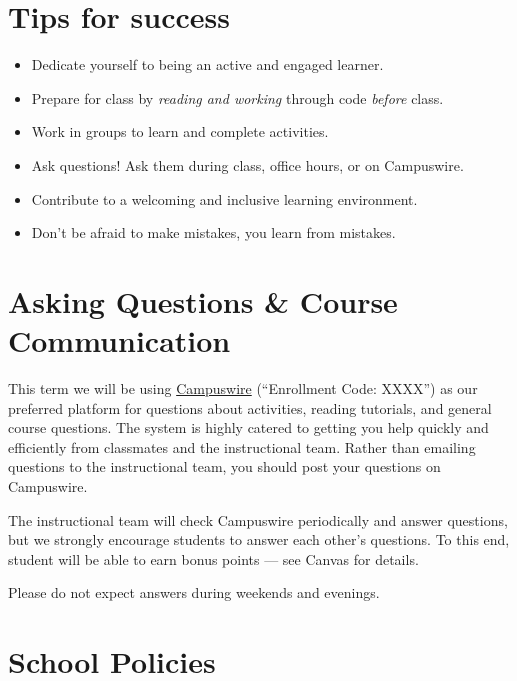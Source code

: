 \documentclass[
  letterpaper,
  DIV=11,
  numbers=noendperiod]{scrreprt}
\providecommand{\tightlist}{%
  \setlength{\itemsep}{0pt}\setlength{\parskip}{0pt}}\usepackage{longtable,booktabs,array}
\begin{document}
\hypertarget{tips-for-success}{%
\section*{Tips for success}\label{tips-for-success}}

\begin{itemize}
\tightlist
\item
  Dedicate yourself to being an active and engaged learner.
\item
  Prepare for class by \emph{reading and working} through code
  \emph{before} class.
\item
  Work in groups to learn and complete activities.
\item
  Ask questions! Ask them during class, office hours, or on Campuswire.
\item
  Contribute to a welcoming and inclusive learning environment.
\item
  Don't be afraid to make mistakes, you learn from mistakes.
\end{itemize}

\hypertarget{asking-questions-course-communication}{%
\section*{Asking Questions \& Course
Communication}\label{asking-questions-course-communication}}

This term we will be using \href{https://campuswire.com}{Campuswire}
(``Enrollment Code: XXXX'') as our preferred platform for questions
about activities, reading tutorials, and general course questions. The
system is highly catered to getting you help quickly and efficiently
from classmates and the instructional team. Rather than emailing
questions to the instructional team, you should post your questions on
Campuswire.

The instructional team will check Campuswire periodically and answer
questions, but we strongly encourage students to answer each other's
questions. To this end, student will be able to earn bonus points ---
see Canvas for details.

Please do not expect answers during weekends and evenings.

\hypertarget{school-policies}{%
\section*{School Policies}\label{school-policies}}
\end{document}
